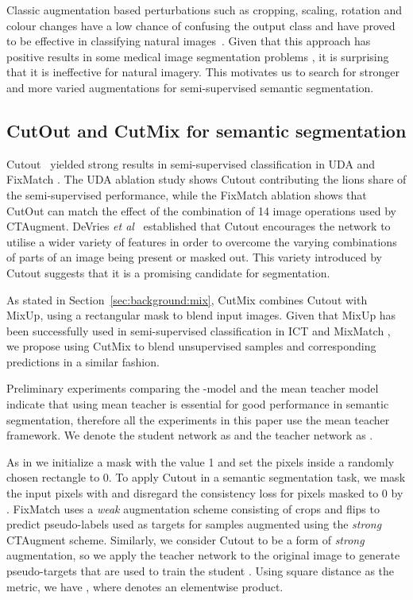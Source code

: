 \documentclass{bmvc2k}
\def\etal{\emph{et al}\bmvaOneDot}
\begin{document}
Classic augmentation based perturbations such as cropping, scaling, rotation and colour changes
have a low chance of confusing the output class and have proved to be effective in classifying natural
images~\cite{Laine:Temporal,Tarvainen:MeanTeachers}. Given that this approach has 
positive results in some medical image segmentation problems \cite{Perone:SemiSupSeg,Li:SemiSupSkin},
it is surprising that it is ineffective for natural imagery. This motivates us to search for stronger
and more varied augmentations for semi-supervised semantic segmentation.




\subsection{CutOut and CutMix for semantic segmentation}
\label{sec:cutout_cutmix}

Cutout~\cite{Devries:Cutout} yielded strong
results in semi-supervised classification in UDA \cite{Xie:UDA} and FixMatch \cite{Sohn:FixMatch}.
The UDA ablation study shows Cutout contributing the lions share of the semi-supervised performance, while
the FixMatch ablation shows that CutOut can match the effect of the combination of 14 image operations used
by CTAugment.
DeVries \etal~\cite{Devries:Cutout} established that Cutout encourages the network to utilise a wider variety
of features in order to overcome the varying combinations of parts of an image being present or masked out.
This variety introduced by Cutout suggests that it is a promising candidate for segmentation.

As stated in Section~\ref{sec:background:mix}, CutMix combines Cutout with MixUp, using a rectangular mask to blend input images. Given that
MixUp has been successfully used in semi-supervised classification in ICT \cite{Verma:ICT} and MixMatch
\cite{Berthelot:MixMatch}, we propose using CutMix to blend unsupervised samples and
corresponding predictions in a similar fashion.

Preliminary experiments comparing the -model \cite{Laine:Temporal} and the mean teacher model \cite{Tarvainen:MeanTeachers} indicate that
using mean teacher is essential for good performance in semantic segmentation, therefore all the experiments in this paper use the mean
teacher framework. We denote the student network as  and the teacher network as .






As in \cite{Devries:Cutout} we initialize a mask  with the value 1 and set the pixels inside a randomly chosen rectangle to 0.
To apply Cutout in a semantic segmentation task, we mask the input pixels with  and disregard the consistency
loss for pixels masked to 0 by . FixMatch \cite{Sohn:FixMatch} uses a \emph{weak} augmentation scheme consisting of crops and flips
to predict pseudo-labels used as targets for samples augmented using the \emph{strong} CTAugment scheme. Similarly,
we consider Cutout to be a form of
\emph{strong} augmentation, so we apply the teacher network  to the original image to generate pseudo-targets that are
used to train the student . Using square distance as the metric, we have
, where  denotes an
elementwise product.
\end{document}

